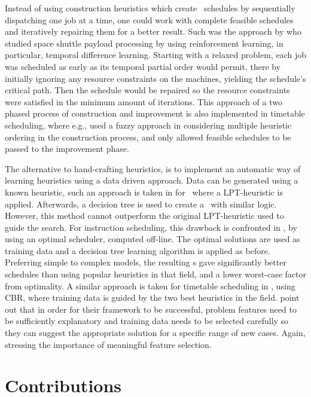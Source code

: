 Instead of using construction heuristics which create \jsp\ schedules by 
sequentially dispatching one job at a time, one could work with complete 
feasible schedules and iteratively repairing them for a better result. Such was 
the approach by \cite{Zhang95} who studied space shuttle payload processing by 
using reinforcement learning, in particular, temporal difference learning. 
Starting with a relaxed problem, each job was scheduled as early as its 
temporal partial order would permit, there by initially ignoring any resource 
constraints on the machines, yielding the schedule's critical path. Then the 
schedule would be repaired so the resource constraints were satisfied in the 
minimum amount of iterations.
This approach of a two phased process of construction and improvement is also 
implemented in timetable scheduling, where e.g., \citet{Asmuni09} used a fuzzy 
approach in considering multiple heuristic ordering in the construction 
process, and only allowed feasible schedules to be passed to the improvement 
phase. 

The alternative to hand-crafting heuristics, is to implement an automatic way of learning heuristics using a data driven approach. %
Data can be generated using a known heuristic, such an approach is taken in 
\cite{Siggi05} for \jsp\, where a LPT-heuristic is applied. Afterwards, a 
decision tree is used to create a \dr\ with similar logic. However, this method 
cannot outperform the original LPT-heuristic used to guide the search. For 
instruction scheduling, this drawback is confronted in 
\citet{Malik08,Russell09,Siggi10}, by using an optimal scheduler, computed 
off-line. The optimal solutions are used as training data and a decision tree 
learning algorithm is applied as before. Preferring simple to complex models, 
the resulting \dr s gave significantly better schedules than using popular 
heuristics in that field, and a lower worst-case factor from optimality. A 
similar approach is taken for timetable scheduling in \cite{Burke06}, using 
CBR, where training data is guided by the two best heuristics 
in the field. 
\citeauthor{Burke06} point out that in order for their framework to be 
successful, problem features need to be sufficiently explanatory and training 
data needs to be selected carefully so they can suggest the appropriate 
solution for a specific range of new cases. 
Again, stressing the importance of meaningful feature selection. 

\section{Contributions}

